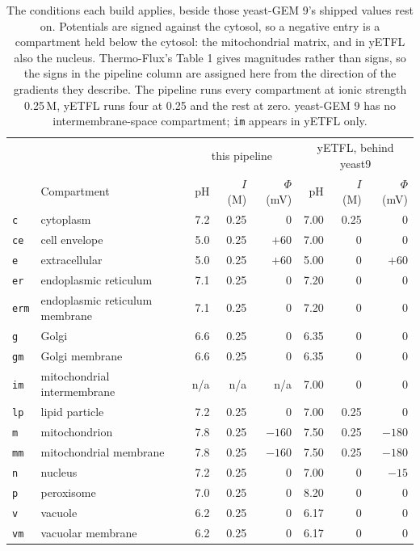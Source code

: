 \begin{table}[!htbp]
  \centering
  \footnotesize
  \caption[Compartment conditions in use]{The conditions each build applies, beside those
  yeast-GEM 9's shipped values rest on. Potentials are signed against the cytosol, so a
  negative entry is a compartment held below the cytosol: the mitochondrial matrix, and in
  yETFL also the nucleus. Thermo-Flux's Table 1 gives magnitudes rather than signs, so the
  signs in the pipeline column are assigned here from the direction of the gradients they
  describe. The pipeline runs every compartment at ionic strength 0.25\,M, yETFL runs four
  at 0.25 and the rest at zero. yeast-GEM 9 has no intermembrane-space compartment;
  \texttt{im} appears in yETFL only.}
  \label{tab:compartment-conditions}
  \begin{tabular}{@{}llrrrrrr@{}}
    \hline
    & & \multicolumn{3}{c}{this pipeline} & \multicolumn{3}{c}{yETFL, behind yeast9} \\
    & Compartment & pH & $I$ (M) & $\Phi$ (mV) & pH & $I$ (M) & $\Phi$ (mV) \\
    \hline
    \texttt{c}   & cytoplasm                      & 7.2 & 0.25 & 0    & 7.00 & 0.25 & 0 \\
    \texttt{ce}  & cell envelope                  & 5.0 & 0.25 & $+60$  & 7.00 & 0    & 0 \\
    \texttt{e}   & extracellular                  & 5.0 & 0.25 & $+60$  & 5.00 & 0    & $+60$ \\
    \texttt{er}  & endoplasmic reticulum          & 7.1 & 0.25 & 0    & 7.20 & 0    & 0 \\
    \texttt{erm} & endoplasmic reticulum membrane & 7.1 & 0.25 & 0    & 7.20 & 0    & 0 \\
    \texttt{g}   & Golgi                          & 6.6 & 0.25 & 0    & 6.35 & 0    & 0 \\
    \texttt{gm}  & Golgi membrane                 & 6.6 & 0.25 & 0    & 6.35 & 0    & 0 \\
    \texttt{im}  & mitochondrial intermembrane    & n/a & n/a  & n/a  & 7.00 & 0    & 0 \\
    \texttt{lp}  & lipid particle                 & 7.2 & 0.25 & 0    & 7.00 & 0.25 & 0 \\
    \texttt{m}   & mitochondrion                  & 7.8 & 0.25 & $-160$ & 7.50 & 0.25 & $-180$ \\
    \texttt{mm}  & mitochondrial membrane         & 7.8 & 0.25 & $-160$ & 7.50 & 0.25 & $-180$ \\
    \texttt{n}   & nucleus                        & 7.2 & 0.25 & 0    & 7.00 & 0    & $-15$ \\
    \texttt{p}   & peroxisome                     & 7.0 & 0.25 & 0    & 8.20 & 0    & 0 \\
    \texttt{v}   & vacuole                        & 6.2 & 0.25 & 0    & 6.17 & 0    & 0 \\
    \texttt{vm}  & vacuolar membrane              & 6.2 & 0.25 & 0    & 6.17 & 0    & 0 \\
    \hline
  \end{tabular}
\end{table}

